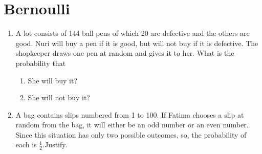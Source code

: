 \section{Bernoulli}
\begin{enumerate}[label=\thesection.\arabic*,ref=\thesection.\theenumi]
	\item A lot consists of 144 ball pens of which 20 are defective and the 
    others are good. Nuri will buy a pen if it is good, but will not buy if it 
    is defective. The shopkeeper draws one pen at random and gives it to her. 
    What is the probability that
    \begin{enumerate}
        \item She will buy it?
        \item She will not buy it?
    \end{enumerate}
\solution

\item A bag contains slips numbered from 1 to 100. If Fatima chooses a slip at random
from the bag, it will either be an odd number or an even number. Since this situation
has only two possible outcomes, so, the probability of each is $\frac{1}{2}$.Justify.\\
\solution

    \end{enumerate}

